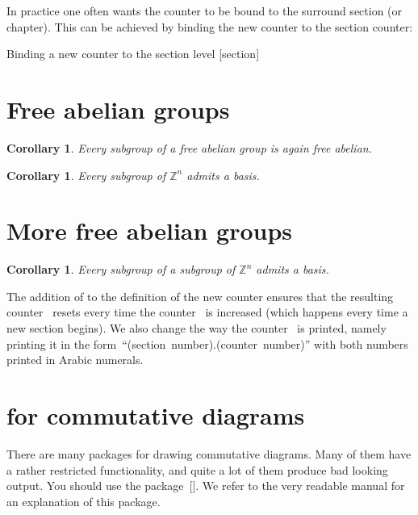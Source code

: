 In practice one often wants the counter to be bound to the surround section (or chapter).
This can be achieved by binding the new counter to the section counter:
\begin{showlatex}[
  before lower = {\stoptoc},
  after lower = {\starttoc \addtocounter{section}{-2}}
]{Binding a new counter to the section level}
[section]
\renewcommand{\thesometheorems}{\thesection.\arabic{sometheorems}}
\newtheorem{corollary}[sometheorems]{Corollary}

\section{Free abelian groups}

\begin{corollary}
  Every subgroup of a free abelian group is again free abelian.
\end{corollary}

\begin{corollary}
  Every subgroup of $\mathbb{Z}^n$ admits a basis.
\end{corollary}

\section{More free abelian groups}

\begin{corollary}
  Every subgroup of a subgroup of $\mathbb{Z}^n$ admits a basis.
\end{corollary}
\end{showlatex}
The addition of \inlinecode{[section]} to the definition of the new counter ensures that the resulting counter~ resets every time the counter~ is increased (which happens every time a new section begins).
We also change the way the counter~ is printed, namely printing it in the form~\enquote{(section~number).(counter~number)} with both numbers printed in Arabic numerals.





\section{ for commutative diagrams}

There are many packages for drawing commutative diagrams.
Many of them have a rather restricted functionality, and quite a lot of them produce bad looking output.
You should use the package~[\packname].
We refer to the very readable manual \cite{tikz-cd} for an explanation of this package.





